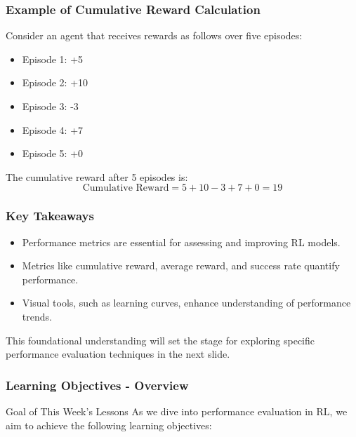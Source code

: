 \documentclass{beamer}
\begin{document}
\begin{frame}[fragile]
    \frametitle{Example of Cumulative Reward Calculation}
    Consider an agent that receives rewards as follows over five episodes: 
    \begin{itemize}
        \item Episode 1: +5
        \item Episode 2: +10
        \item Episode 3: -3
        \item Episode 4: +7
        \item Episode 5: +0
    \end{itemize}
    The cumulative reward after 5 episodes is:
    \begin{equation} 
    \text{Cumulative Reward} = 5 + 10 - 3 + 7 + 0 = 19 
    \end{equation}
\end{frame}

\begin{frame}[fragile]
    \frametitle{Key Takeaways}
    \begin{itemize}
        \item Performance metrics are essential for assessing and improving RL models.
        \item Metrics like cumulative reward, average reward, and success rate quantify performance.
        \item Visual tools, such as learning curves, enhance understanding of performance trends.
    \end{itemize}
    This foundational understanding will set the stage for exploring specific performance evaluation techniques in the next slide.
\end{frame}

\begin{frame}[fragile]
    \frametitle{Learning Objectives - Overview}
    \begin{block}{Goal of This Week's Lessons}
        As we dive into performance evaluation in RL, we aim to achieve the following learning objectives:
    \end{block}
\end{frame}
\end{document}
